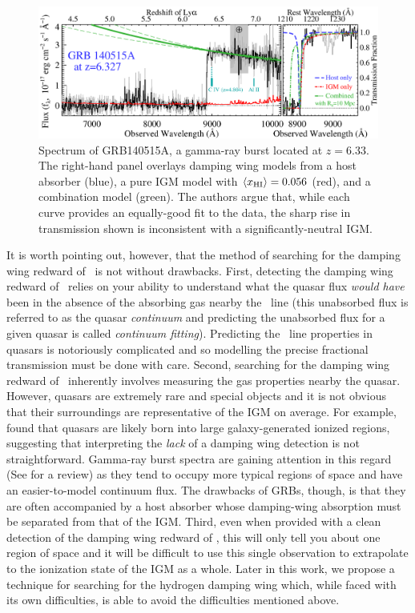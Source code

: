 \begin{figure}[!p]
  \centering
  \includegraphics[width=14cm]{GRB140515A.eps}
  \caption{Spectrum of GRB140515A, a gamma-ray burst located at $z = 6.33$. The right-hand panel overlays damping wing models from a host absorber (blue), a pure IGM model with $\langle x_{\text{HI}}\rangle = 0.056$ (red), and a combination model (green). The authors argue that, while each curve provides an equally-good fit to the data, the sharp rise in transmission shown is inconsistent with a significantly-neutral IGM. }
  \label{fig:GRB140515A}
\end{figure}


It is worth pointing out, however, that the method of searching for the damping wing redward of \lya\ is not without drawbacks. First, detecting the damping wing redward of \lya\ relies on your ability to understand what the quasar flux \textit{would have} been in the absence of the absorbing gas nearby the \lya\ line (this unabsorbed flux is referred to as the quasar \textit{continuum} and predicting the unabsorbed flux for a given quasar is called \textit{continuum fitting}). Predicting the \lya\ line properties in quasars is notoriously complicated and so modelling the precise fractional transmission must be done with care. Second, searching for the damping wing redward of \lya\ inherently involves measuring the gas properties nearby the quasar. However, quasars are extremely rare and special objects and it is not obvious that their surroundings are representative of the IGM on average. For example, \cite{Lidz:2007mz} found that quasars are likely born into large galaxy-generated ionized regions, suggesting that interpreting the \textit{lack} of a damping wing detection is not straightforward. Gamma-ray burst spectra are gaining attention in this regard (See \citealt{Salvaterra:2015gpa} for a review) as they tend to occupy more typical regions of space and have an easier-to-model continuum flux. The drawbacks of GRBs, though, is that they are often accompanied by a host absorber whose damping-wing absorption must be separated from that of the IGM. Third, even when provided with a clean detection of the damping wing redward of \lya, this will only tell you about one region of space and it will be difficult to use this single observation to extrapolate to the ionization state of the IGM as a whole. Later in this work, we propose a technique for searching for the hydrogen damping wing which, while faced with its own difficulties, is able to avoid the difficulties mentioned above. 

